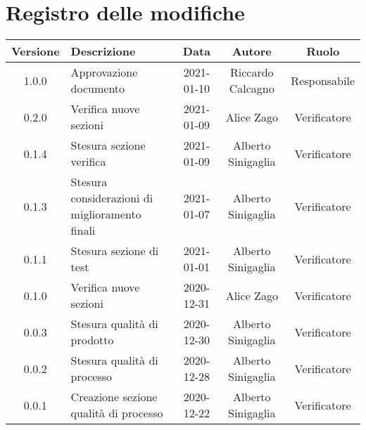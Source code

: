 \section*{Registro delle modifiche}

\begin{center}
	\begin{longtable}{|c|p{5cm}|c|c|c|}
	\hline
	\rowcolor{lighter-grayer}
	\textbf{Versione} & \textbf{Descrizione} & \textbf{Data} & \textbf{Autore} & \textbf{Ruolo} \\
	\hline
	\endfirsthead


	1.0.0 & Approvazione documento & 2021-01-10 & Riccardo Calcagno & Responsabile \\
	\hline
	0.2.0 & Verifica nuove sezioni & 2021-01-09 & Alice Zago & Verificatore \\
	\hline
	0.1.4 & Stesura sezione verifica & 2021-01-09 & Alberto Sinigaglia & Verificatore \\
	\hline
	0.1.3 & Stesura considerazioni di miglioramento finali & 2021-01-07 & Alberto Sinigaglia & Verificatore \\
	\hline
	0.1.1 & Stesura sezione di test & 2021-01-01 & Alberto Sinigaglia & Verificatore \\
	\hline
	0.1.0 & Verifica nuove sezioni & 2020-12-31 & Alice Zago & Verificatore \\
	\hline
	0.0.3 & Stesura qualità di prodotto & 2020-12-30 & Alberto Sinigaglia & Verificatore \\
	\hline
	0.0.2 & Stesura qualità di processo & 2020-12-28 & Alberto Sinigaglia & Verificatore \\
	\hline
	0.0.1 & Creazione sezione qualità di processo & 2020-12-22 & Alberto Sinigaglia & Verificatore \\
	\hline

	\end{longtable}
\end{center}